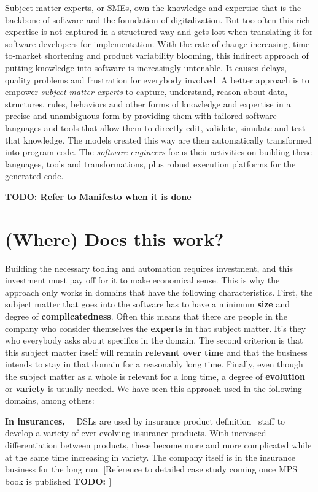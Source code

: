 \documentclass[runningheads]{llncs}
\newcommand\parhead[1]{\vspace{1mm}\noindent\textbf{{#1}}\ \ }
\newcommand\todo[1]{\vspace{1mm}\noindent\textbf{\color{red} {{TODO: {#1}} }}}
\begin{document}
Subject matter experts, or SMEs, own the knowledge and expertise that is the
backbone of software and the foundation of digitalization. But too often this
rich expertise is not captured in a structured way and gets lost when
translating it for software developers for implementation. With the rate of
change increasing, time-to-market shortening and product variability blooming,
this indirect approach of putting knowledge into software is increasingly
untenable. It causes delays, quality problems and frustration for everybody
involved. A better approach is to empower \emph{subject matter experts} to
capture, understand, reason about data, structures, rules, behaviors and other
forms of knowledge and expertise in a precise and unambiguous form by providing
them with tailored software languages and tools that allow them to directly
edit, validate, simulate and test that knowledge. The models created this way
are then automatically transformed into program code. The \emph{software
engineers} focus their activities on building these languages, tools and
transformations, plus robust execution platforms for the generated code.

\todo{Refer to Manifesto when it is done}

\section{(Where) Does this work?}

Building the necessary tooling and automation requires investment, and this
investment must pay off for it to make economical sense. This is why the
approach only works in domains that have the following characteristics. First,
the subject matter that goes into the software has to have a minimum
\textbf{size} and degree of \textbf{complicatedness}. Often this means that
there are people in the company who consider themselves the \textbf{experts} in
that subject matter. It's they who everybody asks about specifics in the domain.
The second criterion is that this subject matter itself will remain
\textbf{relevant over time} and that the business intends to stay in that domain
for a reasonably long time. Finally, even though the subject matter as a whole
is relevant for a long time, a degree of \textbf{evolution} or \textbf{variety}
is usually needed. We have seen this approach used in the following domains, among others:

\parhead{In insurances,} DSLs are used by insurance product definition~\cite{zurich} staff to develop a
variety of ever evolving insurance products. With increased differentiation
between products, these become more and more complicated while at the same time
increasing in variety. The company itself is in the insurance business for the
long run. [Reference to detailed case study coming once MPS book is published\todo{}]
\end{document}
